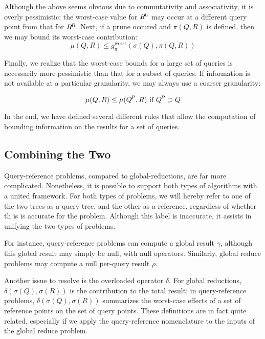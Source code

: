 \documentclass[times, 10pt,twocolumn]{article}
\DeclareMathOperator*{\worst}{worst}
\newcommand{\kdleft}{\hspace{-0.02in}^L}
\newcommand{\kdright}{\hspace{-0.02in}^R}
\newcommand{\kdparent}{\hspace{-0.02in}^P}
\newcommand{\allpi}{\pi}
\newcommand{\gpiworst}{g_{\allpi}^{\worst}}
\newcommand{\allrho}{\rho}
\newcommand{\allmu}{\mu}
\newcommand{\allsigma}{\sigma}
\begin{document}
\noindent Although the above seems obvious due to commutativity and associativity, it is overly pessimistic: the worst-case value for $R\kdleft$ may occur at a different query point from that for $R\kdright$.
Next, if a prune occured and $\pi(Q, R)$ is defined, then we may bound its worst-case contribution:
\begin{equation}
\allmu(Q, R) \leq \gpiworst(\allsigma(Q), \allpi(Q, R))
\label{eqn:pimu}
\end{equation}

\noindent Finally, we realize that the worst-case bounds for a large set of queries is necessarily more pessimistic than that for a subset of queries.
If information is not available at a particular granularity, we may always use a coarser granularity:

\begin{equation}
\allmu(Q, R) \leq \allmu(Q\kdparent, R) \text{ if } Q\kdparent \supset Q
\end{equation}

\noindent In the end, we have defined several different rules that allow the computation of bounding information on the results for a set of queries.


\subsection{Combining the Two}

Query-reference problems, compared to global-reductions, are far more complicated.
Nonetheless, it is possible to support both types of algorithms with a united framework.
For both types of problems, we will hereby refer to one of the two trees as a query tree, and the other as a reference, regardless of whether th is is accurate for the problem.
Although this label is inaccurate, it assists in unifying the two types of problems.

For instance, query-reference problems can compute a global result $\gamma$, although this global result may simply be null, with null operators.
Similarly, global reduce problems may compute a null per-query result $\allrho$.

Another issue to resolve is the overloaded operator $\delta$.
For global reductions, $\delta(\allsigma(Q), \allsigma(R))$ is the contribution to the total result; in query-reference problems, $\delta(\allsigma(Q), \allsigma(R))$ summarizes the worst-case effects of a set of reference points on the set of query points.
These definitions are in fact quite related, especially if we apply the query-reference nomenclature to the inputs of the global reduce problem.
\end{document}
